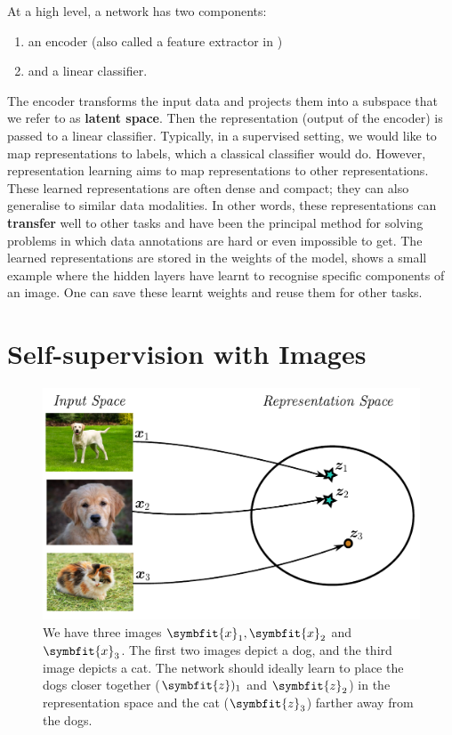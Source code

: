 At a high level, a network has two components:
\begin{enumerate}
    \item an encoder (also called a feature extractor in )
    \item and a linear classifier.
\end{enumerate}
The encoder transforms the input data and projects them into a subspace that we refer to as \textbf{latent space}. Then the representation (output of the encoder) is passed to a linear classifier. Typically, in a supervised setting, we would like to map representations to labels, which a classical classifier would do. 
However, representation learning aims to map representations to other representations. These learned representations are often dense and compact; they can also generalise to similar data modalities. In other words, these representations can \textbf{transfer} well to other tasks and have been the principal method for solving problems in which data annotations are hard or even impossible to get. The learned representations are stored in the weights of the model,  shows a small example where the hidden layers have learnt to recognise specific components of an image. One can save these learnt weights and reuse them for other tasks. 

\section{Self-supervision with Images} \label{sec:self-sup-with-images}

\begin{figure}
    \centering
    \includegraphics[scale=0.4]{chapters/assets/ssl_figs/representation_space.pdf}
    \caption{We have three images $\symbfit{x}_1, \symbfit{x}_2$ and $\symbfit{x}_3$. The first two images depict a dog, and the third image depicts a cat. The network should ideally learn to place the dogs closer together ($\symbfit{z})_1$ and $\symbfit{z}_2$) in the representation space and the cat ($\symbfit{z}_3$) farther away from the dogs.}
    \label{fig:my_label}
\end{figure}

